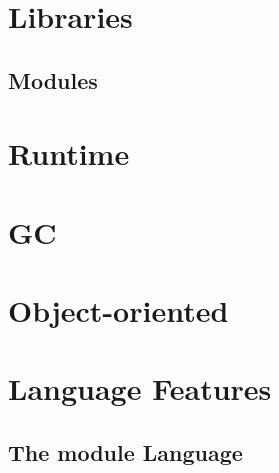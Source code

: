\documentclass[svgnames,12pt,a4paper]{book}
\begin{document}
  
  
  
  
  
  
  
  

\chapter{Libraries}



















\section{Modules}


\chapter{Runtime}
\label{sec:runtime}



\chapter{GC}
\label{sec:gc}



\chapter{Object-oriented}



\chapter{Language Features}
\label{sec:compl-lang-feat}










\section{The module Language}
\label{sec:module-language}
\end{document}
